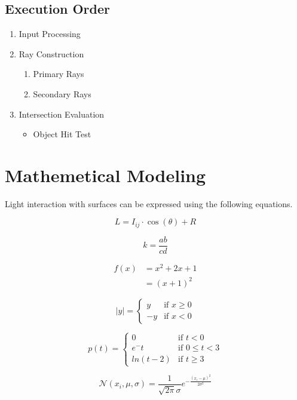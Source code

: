 \documentclass[11pt,a4paper]{article}
\theoremstyle{plain}
\theoremstyle{definition}
\theoremstyle{remark}
\begin{document}
\subsection{Execution Order}
\begin{enumerate}
    \item Input Processing
    \item Ray Construction
        \begin{enumerate}
            \item Primary Rays
            \item Secondary Rays
        \end{enumerate}
    \item Intersection Evaluation
        \begin{itemize}
            \item Object Hit Test
        \end{itemize}
\end{enumerate}

\section{Mathemetical Modeling}
Light interaction with surfaces can be expressed using the following equations.

\begin{equation}
    L = I_{ij} \cdot \cos(\theta) + R
\end{equation}

$$k = \frac{ab}{cd}$$

\begin{align*}
    f(x) &= x^2 + 2x + 1\\
        &= (x+1)^2\tag{2}
\end{align*}

\[
\lvert y \rvert =
\begin{cases}
    y & \text{if } x \geq 0 \\
    -y  & \text{if } x < 0
\end{cases}
\]

\[
p(t) =
\begin{cases}
    0 & \text{if } t < 0 \\
    e^-t  & \text{if } 0 \leq t < 3 \\
    ln(t-2) & \text{if } t \geq 3
\end{cases}
\]

$$ \mathcal{N}(x_i, \mu, \sigma) = \frac{1}{\sqrt{2\pi}\sigma}e^{-{\frac{ ({x_i-\mu})^2}{2\sigma^2}}} $$
\end{document}

